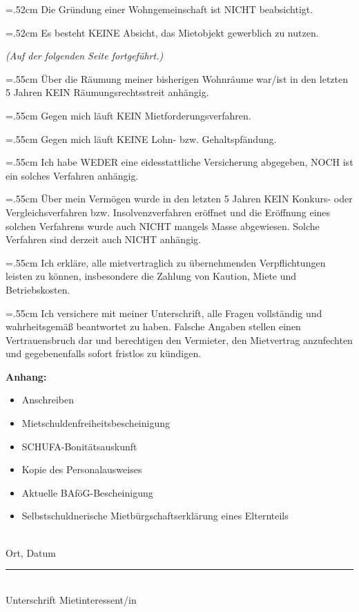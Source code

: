 \documentclass[10pt, a4paper]{letter}
\newlength\TextFieldLength
\newcommand\TextFieldFill[2][]{%
  \setlength\TextFieldLength{\linewidth}%
  \settowidth{\dimen0}{#2 }%
  \addtolength\TextFieldLength{-\dimen0}%
  \addtolength\TextFieldLength{-2.22221pt}%
  \TextField[#1,width=\TextFieldLength]{\raisebox{2pt}{#2 }}%
}
\begin{document}
\CheckBox[name=wg]{}
\hangindent=.52cm Die Gründung einer Wohngemeinschaft ist NICHT beabsichtigt.

\CheckBox[name=gewerblich]{}
\hangindent=.52cm Es besteht KEINE Absicht, das Mietobjekt gewerblich zu nutzen.

\TextFieldFill[name=tiere]{Ich habe folgene Haustiere: }

\begin{flushright}
    \textit{(Auf der folgenden Seite fortgeführt.)}
\end{flushright}

\pagebreak


\CheckBox[name=räumung]{}
\hangindent=.55cm Über die Räumung meiner bisherigen Wohnräume war/ist in den letzten 5 Jahren KEIN Räumungsrechtsstreit anhängig.

\CheckBox[name=mietforderung]{}
\hangindent=.55cm Gegen mich läuft KEIN Mietforderungsverfahren.

\CheckBox[name=pfändung]{}
\hangindent=.55cm Gegen mich läuft KEINE Lohn- bzw. Gehaltspfändung.

\CheckBox[name=versicherung]{}
\hangindent=.55cm Ich habe WEDER eine eidesstattliche Versicherung abgegeben, NOCH ist ein solches Verfahren anhängig.

\CheckBox[name=konkurs]{}
\hangindent=.55cm Über mein Vermögen wurde in den letzten 5 Jahren KEIN Konkurs- oder Vergleichsverfahren bzw. Insolvenzverfahren eröffnet und die Eröffnung eines solchen Verfahrens wurde auch NICHT mangels Masse abgewiesen. Solche Verfahren sind derzeit auch NICHT anhängig.

\CheckBox[name=verpflichtungen]{}
\hangindent=.55cm Ich erkläre, alle mietvertraglich zu übernehmenden Verpflichtungen leisten zu können, insbesondere die Zahlung von Kaution, Miete und Betriebskosten.

\CheckBox[name=wahrheit]{}
\hangindent=.55cm Ich versichere mit meiner Unterschrift, alle Fragen vollständig und wahrheitsgemäß beantwortet zu haben. Falsche Angaben stellen einen Vertrauensbruch dar und berechtigen den Vermieter, den Mietvertrag anzufechten und gegebenenfalls sofort fristlos zu kündigen.

\vspace{.4cm}

\textbf{Anhang:}
\begin{itemize}
    \item Anschreiben
    \item Mietschuldenfreiheitsbescheinigung
    \item SCHUFA-Bonitätsauskunft
    \item Kopie des Personalausweises
    \item Aktuelle BAföG-Bescheinigung
    \item Selbstschuldnerische Mietbürgschaftserklärung eines Elternteils
\end{itemize}

\vspace{1cm}

\TextField[name=unterschrift,width=9cm]{}\\
Ort, Datum
\vspace{2cm} %

\rule{9cm}{0.5pt} \\ %
Unterschrift Mietinteressent/in
\end{document}
